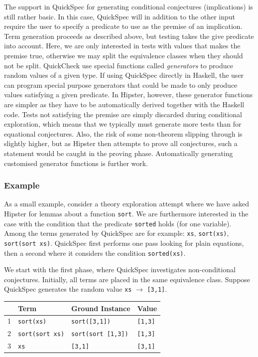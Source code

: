 The support in QuickSpec for generating conditional conjectures (implications) is still rather basic. In this case, QuickSpec will in addition to the other input require the user to specify a predicate to use as the premise of an implication. Term generation proceeds as described above, but testing takes the give predicate into account. Here, we are only interested in tests with values that makes the premise true, otherwise we may split the equivalence classes when they should not be split. QuickCheck use special functions called \emph{generators} to produce random values of a given type. If using QuickSpec directly in Haskell, the user can program special purpose generators that could be made to only produce values satisfying a given predicate. In Hipster, however, these generator functions are simpler as they have to be automatically derived together with the Haskell code. Tests not satisfying the premise are simply discarded during conditional exploration, which means that we typically must generate more tests than for equational conjectures. Also, the risk of some non-theorem slipping through is slightly higher, but as Hipster then attempts to prove all conjectures, such a statement would be caught in the proving phase. Automatically generating customised generator functions is further work. 

\subsubsection*{Example}
As a small example, consider a theory exploration attempt where we have asked Hipster for lemmas about a function \texttt{sort}. We are furthermore interested in the case with the condition that the predicate \texttt{sorted} holds (for one variable). Among the terms generated by QuickSpec are for example: \texttt{xs}, \texttt{sort(xs)}, \texttt{sort(sort xs)}. QuickSpec first performs one pass looking for plain equations, then a second where it considers the condition \texttt{sorted(xs)}. 

We start with the first phase, where QuickSpec investigates non-conditional conjectures. Initially, all terms are placed in the same equivalence class. Suppose QuickSpec generates the random value \texttt{xs} $\rightarrow$ \texttt{[3,1]}.     

\begin{tabularx}{\textwidth}{l  X  X  X}
 & Term & Ground Instance & Value \\
 \hline
1 \quad &\texttt{sort(xs)} & \texttt{sort([3,1])} & \texttt{[1,3]} \\
2 \quad&\texttt{sort(sort xs)} &\texttt{sort(sort [1,3])} & \texttt{[1,3]}\\
3 \quad &\texttt{xs} &\texttt{[3,1]} & \texttt{[3,1]} \\
\end{tabularx}

